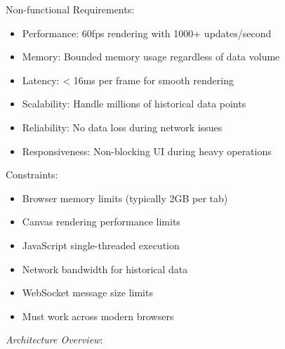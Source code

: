 \documentclass[11pt]{article}
\begin{document}
Non-functional Requirements:

\begin{itemize}
\item Performance: 60fps rendering with 1000+ updates/second
\item Memory: Bounded memory usage regardless of data volume
\item Latency: < 16ms per frame for smooth rendering
\item Scalability: Handle millions of historical data points
\item Reliability: No data loss during network issues
\item Responsiveness: Non-blocking UI during heavy operations
\end{itemize}

Constraints:

\begin{itemize}
\item Browser memory limits (typically 2GB per tab)
\item Canvas rendering performance limits
\item JavaScript single-threaded execution
\item Network bandwidth for historical data
\item WebSocket message size limits
\item Must work across modern browsers
\end{itemize}

\emph{Architecture Overview}:
\end{document}
